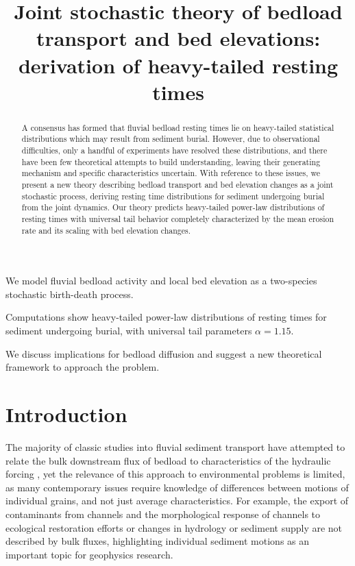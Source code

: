 \documentclass[draft]{agujournal2018}
\begin{document}
\title{Joint stochastic theory of bedload transport and bed elevations: derivation of heavy-tailed resting times}

\begin{keypoints}
\item We model fluvial bedload activity and local bed elevation as a two-species stochastic birth-death process.
\item Computations show heavy-tailed power-law distributions of resting times for sediment undergoing burial, with universal tail parameters $\alpha=1.15$.
\item We discuss implications for bedload diffusion and suggest a new theoretical framework to approach the problem.

\end{keypoints}

\begin{abstract}
A consensus has formed that fluvial bedload resting times lie on heavy-tailed statistical distributions which may result from sediment burial.
However, due to observational difficulties, only a handful of experiments have resolved these distributions, and there have been few theoretical attempts to build understanding, leaving their generating mechanism and specific characteristics uncertain.
With reference to these issues, we present a new theory describing bedload transport and bed elevation changes as a joint stochastic process, deriving resting time distributions for sediment undergoing burial from the joint dynamics.
Our theory predicts heavy-tailed power-law distributions of resting times with universal tail behavior completely characterized by the mean erosion rate and its scaling with bed elevation changes.
\end{abstract} 

\section{Introduction}

The majority of classic studies into fluvial sediment transport have attempted to relate the bulk downstream flux of bedload to characteristics of the hydraulic forcing \citep[e.g.][]{Yalin1972}, yet the relevance of this approach to environmental problems is limited, as many contemporary issues require knowledge of differences between motions of individual grains, and not just average characteristics.
For example, the export of contaminants from channels \citep[e.g.][]{Malmon2005} and the morphological response of channels to ecological restoration efforts \citep[e.g.][]{Gaeuman2017} or changes in hydrology or sediment supply \citep[e.g.][]{Hassan2017} are not described by bulk fluxes, highlighting individual sediment motions as an important topic for geophysics research.
\end{document}
